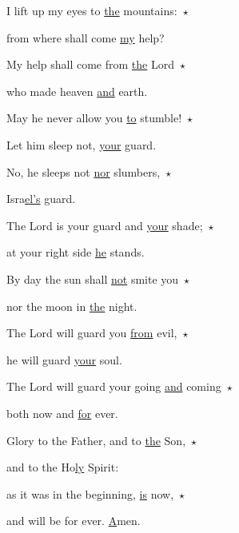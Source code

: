 \noindent I lift up my eyes to \uline{the} mountains:~$\star$~\nopagebreak

from where shall come \uline{my} help?

\noindent My help shall come from \uline{the} Lord~$\star$~\nopagebreak

who made heaven \uline{and} earth.

\noindent May he never allow you \uline{to} stumble!~$\star$~\nopagebreak

Let him sleep not, \uline{your} guard.

\noindent No, he sleeps not \uline{nor} slumbers,~$\star$~\nopagebreak

Isra\uline{el’s} guard.

\noindent The Lord is your guard and \uline{your} shade;~$\star$~\nopagebreak

at your right side \uline{he} stands.

\noindent By day the sun shall \uline{not} smite you~$\star$~\nopagebreak

nor the moon in \uline{the} night.

\noindent The Lord will guard you \uline{from} evil,~$\star$~\nopagebreak

he will guard \uline{your} soul.

\noindent The Lord will guard your going \uline{and} coming~$\star$~\nopagebreak

both now and \uline{for} ever.

\noindent Glory to the Father, and to \uline{the} Son,~$\star$~\nopagebreak

and to the Ho\uline{ly} Spirit:

\noindent as it was in the beginning, \uline{is} now,~$\star$~\nopagebreak

and will be for ever. \uline{A}men.
